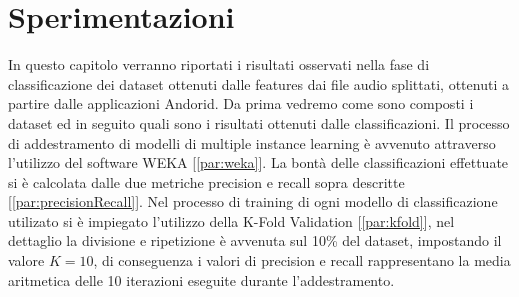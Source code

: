 
\chapter{Sperimentazioni}
\label{chap:sperim}
In questo capitolo verranno riportati i risultati osservati nella fase di classificazione dei dataset ottenuti dalle features dai file audio splittati, ottenuti a partire dalle applicazioni Andorid. Da prima vedremo come sono composti i dataset ed in seguito quali sono i risultati ottenuti dalle classificazioni. Il processo di addestramento di modelli di multiple instance learning è avvenuto attraverso l'utilizzo del software WEKA [\ref{par:weka}]. 
La bontà delle classificazioni effettuate si è calcolata dalle due metriche precision e recall sopra descritte [\ref{par:precisionRecall}]. Nel processo di training di ogni modello di classificazione utilizato si è impiegato l'utilizzo della K-Fold Validation [\ref{par:kfold}], nel dettaglio la divisione e ripetizione è avvenuta sul 10\% del dataset, impostando il valore $K = 10$, di conseguenza i valori di precision e recall rappresentano la media aritmetica delle 10 iterazioni eseguite durante l'addestramento.
